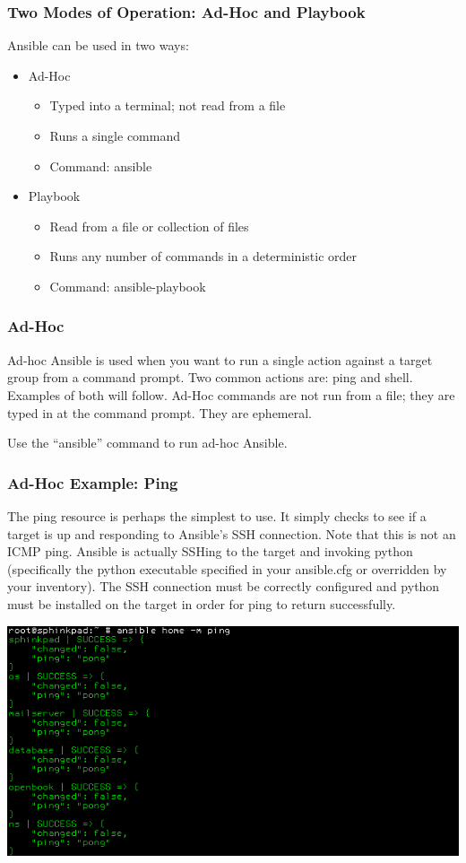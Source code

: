 \documentclass[helvetica,english,utf8,notitle,nologo]{beamer}
\begin{document}
\begin{frame}
  \frametitle{Two Modes of Operation: Ad-Hoc and Playbook}

  Ansible can be used in two ways:

  \begin{itemize}
  \item Ad-Hoc
    \begin{itemize}
    \item Typed into a terminal; not read from a file
    \item Runs a single command
    \item Command: ansible
    \end{itemize}
  \item Playbook
    \begin{itemize}
    \item Read from a file or collection of files
    \item Runs any number of commands in a deterministic order
    \item Command: ansible-playbook
    \end{itemize}
  \end{itemize}
\end{frame}

\begin{frame}
  \frametitle{Ad-Hoc}

  Ad-hoc Ansible is used when you want to run a single action against
  a target group from a command prompt. Two common actions are: ping
  and shell. Examples of both will follow. Ad-Hoc commands are not run
  from a file; they are typed in at the command prompt. They are
  ephemeral.

  Use the ``ansible'' command to run ad-hoc Ansible.
\end{frame}

\begin{frame}
  \frametitle{Ad-Hoc Example: Ping}

  The ping resource is perhaps the simplest to use. It simply checks
  to see if a target is up and responding to Ansible's SSH
  connection. Note that this is not an ICMP ping. Ansible is actually
  SSHing to the target and invoking python (specifically the python
  executable specified in your ansible.cfg or overridden by your
  inventory). The SSH connection must be correctly configured and
  python must be installed on the target in order for ping to return
  successfully.

  \includegraphics[scale=0.44]{img_4}
\end{frame}
\end{document}
